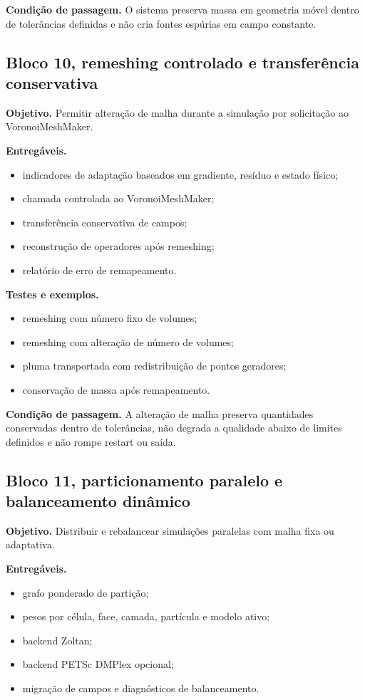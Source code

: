 \documentclass[11pt,a4paper]{article}
\begin{document}
\textbf{Condi\c{c}\~ao de passagem.} O sistema preserva massa em geometria m\'ovel dentro de toler\^ancias definidas e n\~ao cria fontes esp\'urias em campo constante.

\subsection*{Bloco 10, remeshing controlado e transfer\^encia conservativa}

\textbf{Objetivo.} Permitir altera\c{c}\~ao de malha durante a simula\c{c}\~ao por solicita\c{c}\~ao ao VoronoiMeshMaker.

\textbf{Entreg\'aveis.}
\begin{itemize}
  \item indicadores de adapta\c{c}\~ao baseados em gradiente, res\'iduo e estado f\'isico;
  \item chamada controlada ao VoronoiMeshMaker;
  \item transfer\^encia conservativa de campos;
  \item reconstru\c{c}\~ao de operadores ap\'os remeshing;
  \item relat\'orio de erro de remapeamento.
\end{itemize}

\textbf{Testes e exemplos.}
\begin{itemize}
  \item remeshing com n\'umero fixo de volumes;
  \item remeshing com altera\c{c}\~ao de n\'umero de volumes;
  \item pluma transportada com redistribui\c{c}\~ao de pontos geradores;
  \item conserva\c{c}\~ao de massa ap\'os remapeamento.
\end{itemize}

\textbf{Condi\c{c}\~ao de passagem.} A altera\c{c}\~ao de malha preserva quantidades conservadas dentro de toler\^ancias, n\~ao degrada a qualidade abaixo de limites definidos e n\~ao rompe restart ou sa\'ida.

\subsection*{Bloco 11, particionamento paralelo e balanceamento din\^amico}

\textbf{Objetivo.} Distribuir e rebalancear simula\c{c}\~oes paralelas com malha fixa ou adaptativa.

\textbf{Entreg\'aveis.}
\begin{itemize}
  \item grafo ponderado de parti\c{c}\~ao;
  \item pesos por c\'elula, face, camada, part\'icula e modelo ativo;
  \item backend Zoltan;
  \item backend PETSc DMPlex opcional;
  \item migra\c{c}\~ao de campos e diagn\'osticos de balanceamento.
\end{itemize}
\end{document}
